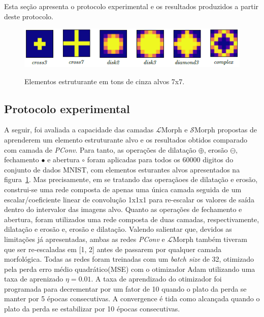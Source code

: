Esta seção apresenta o protocolo experimental e os resultados produzidos a partir deste protocolo.

\begin{figure}
    \caption{Elementos estruturante em tons de cinza alvos 7x7.}
    \centering
    \includegraphics[scale=0.8]{images/ElementosEstruturantes}
    \label{fig:elementos-estruturantes}
\end{figure}

\subsection{Protocolo experimental}
\label{subsec:protocolo-experimental}

A seguir, foi avaliada a capacidade das camadas $\mathcal{L}$Morph e $\mathcal{S}$Morph propostas de aprenderem um elemento estruturante alvo e os resultados obtidos comparado com camada de \emph{PConv}.
Para tanto, as operações de dilatação $\oplus$, erosão $\ominus$, fechamento $\bullet$ e abertura $\circ$ foram aplicadas para todos os 60000 digitos do conjunto de dados MNIST, com elementos esturantes alvos apresentados na figura~\ref{fig:elementos-estruturantes}.
Mas precisamente, em se tratando das operaçãoes de dilatação e erosão, construi-se uma rede composta de apenas uma única camada seguida de um escalar/coeficiente linear de convolução 1x1x1 para re-escalar os valores de saída dentro do intervalor das imagens alvo.
Quanto as operações de fechamento e abertura, foram utilizados uma rede composta de duas camadas, respectivamente, dilatação e erosão e, erosão e dilatação.
Valendo salientar que, devidos as limitações já apresentadas, ambas as redes \emph{PConv} e $\mathcal{L}$Morph também tiveram que ser re-escaladas em [1, 2] antes de passarem por qualquer camada morfológica.
Todas as redes foram treinadas com um \emph{batch size} de 32, otimizado pela perda erro médio quadrático(MSE) com o otimizador Adam utilizando uma taxa de aprenizado $\eta = 0.01$.
A taxa de aprendizado do otimizador foi programada para decrementar por um fator de 10 quando o plato da perda se manter por 5 épocas consecutivas.
A convergence é tida como alcançada quando o plato da perda se estabilizar por 10 épocas consecutivas.

